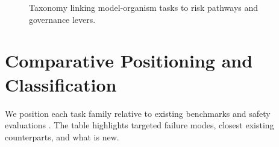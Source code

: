 \documentclass[11pt]{article}
\begin{document}
\begin{figure}[H]
\begin{adjustbox}{max width=\linewidth}
\end{adjustbox}
\caption{Taxonomy linking model-organism tasks to risk pathways and governance levers.}
\label{fig:taxonomy}
\end{figure}

\section{Comparative Positioning and Classification}
We position each task family relative to existing benchmarks and safety evaluations \citep{Liang2022HELM,Srivastava2023BIGBench,Lin2022TruthfulQA,Perez2022ModelWrittenEvals}. The table highlights targeted failure modes, closest existing counterparts, and what is new.
\end{document}
